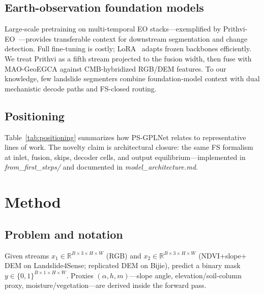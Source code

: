 \subsection{Earth-observation foundation models}
Large-scale pretraining on multi-temporal EO stacks---exemplified by Prithvi-EO~\cite{szink2024prithvi,jakubowski2024prithvi,chawla2023geoaifms}---provides transferable context for downstream segmentation and change detection. Full fine-tuning is costly; LoRA~\cite{houlsby2019lora} adapts frozen backbones efficiently. We treat Prithvi as a fifth stream projected to the fusion width, then fuse with MAO-GeoEGCA against CMB-hybridized RGB/DEM features. To our knowledge, few landslide segmenters combine foundation-model context with dual mechanistic decode paths and FS-closed routing.

\subsection{Positioning}
Table~\ref{tab:positioning} summarizes how PS-GPLNet relates to representative lines of work. The novelty claim is architectural closure: the same FS formalism at inlet, fusion, skips, decoder cells, and output equilibrium---implemented in \textit{from\_first\_steps/} and documented in \textit{model\_architecture.md}.

\begin{table}[htbp]
\centering
\caption{Conceptual positioning (dense segmentation setting).}
\label{tab:positioning}
\end{table}

\section{Method}
\subsection{Problem and notation}
Given streams $x_1\in\mathbb{R}^{B\times 3\times H\times W}$ (RGB) and $x_2\in\mathbb{R}^{B\times 3\times H\times W}$ (NDVI$+$slope$+$DEM on Landslide4Sense; replicated DEM on Bijie), predict a binary mask $y\in\{0,1\}^{B\times 1\times H\times W}$. Proxies $(\alpha,h,m)$---slope angle, elevation/soil-column proxy, moisture/vegetation---are derived inside the forward pass.

